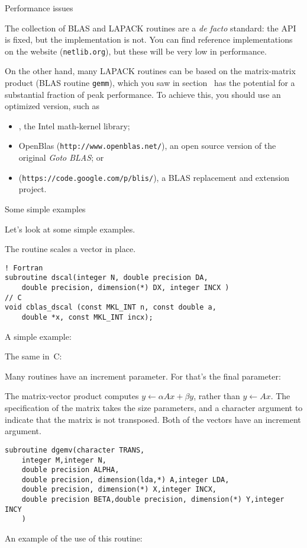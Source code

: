 
 {Performance issues}

The collection of BLAS and LAPACK routines are a \emph{de facto}
standard: the \ac{API} is fixed, but the implementation is not.
You can find reference implementations on the
 website (\texttt{netlib.org}), but
these will be very low in performance.

On the other hand, many LAPACK routines can be based on
the matrix-matrix product (BLAS routine \texttt{gemm}),
which you saw in section~ has the potential
for a substantial fraction of peak performance. To achieve
this, you should use an optimized version, such as
\begin{itemize}
\item {}, the Intel math-kernel library;
\item OpenBlas (\texttt{http://www.openblas.net/}), an open source
  version of the original \emph{Goto BLAS}; or
\item {} (\texttt{https://code.google.com/p/blis/}), a BLAS replacement and
  extension project.
\end{itemize}

 {Some simple examples}

Let's look at some simple examples.

The routine  scales a vector in place.
\begin{verbatim}
! Fortran
subroutine dscal(integer N, double precision DA,
    double precision, dimension(*) DX, integer INCX )  
// C
void cblas_dscal (const MKL_INT n, const double a, 
    double *x, const MKL_INT incx);
\end{verbatim}
A simple example:
%

The same in~C:
%

Many routines have an increment parameter. For  that's the final parameter:
%

The matrix-vector product  computes $y\leftarrow \alpha Ax+\beta y$,
rather than $y\leftarrow Ax$.
The specification of the matrix takes the  size parameters,
and a character argument  to indicate that the matrix is not transposed.
Both of the vectors have an increment argument.
\begin{verbatim}
subroutine dgemv(character TRANS,
    integer M,integer N,
    double precision ALPHA,
    double precision, dimension(lda,*) A,integer LDA,
    double precision, dimension(*) X,integer INCX,
    double precision BETA,double precision, dimension(*) Y,integer INCY
    )
\end{verbatim}
An example of the use of this routine:
%

